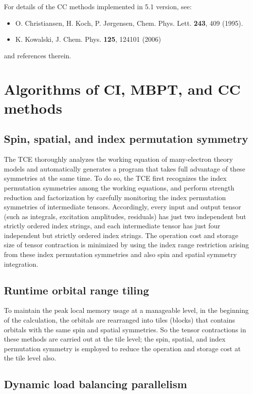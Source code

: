For details of the CC methods implemented in 5.1 version, see:
\begin{itemize}
\item O. Christiansen, H. Koch, P. J\o rgensen, Chem. Phys. Lett. {\bf 243}, 409 (1995). 
\item K. Kowalski, J. Chem. Phys. {\bf 125}, 124101 (2006)
\end{itemize}
and references therein.

\section{Algorithms of CI, MBPT, and CC methods}

\subsection{Spin, spatial, and index permutation symmetry}

The TCE thoroughly analyzes the working equation of many-electron theory models and 
automatically generates a program that takes full advantage of these symmetries at the same time.
To do so, the TCE first recognizes the index permutation symmetries among the working equations,
and perform strength reduction and factorization by carefully monitoring the index permutation
symmetries of intermediate tensors.  Accordingly, every input and output tensor (such as 
integrals, excitation amplitudes, residuals) has just two independent but strictly ordered index strings,
and each intermediate tensor has just four independent but strictly ordered index strings.
The operation cost and storage size of tensor contraction is minimized by using the index range 
restriction arising from these index permutation symmetries and also spin and spatial symmetry integration.

\subsection{Runtime orbital range tiling}

To maintain the peak local memory usage at a manageable level, in the beginning of the calculation,
the orbitals are rearranged into tiles (blocks) that contains orbitals with the same spin and spatial
symmetries.  So the tensor contractions in these methods are carried out at the tile level; the spin,
spatial, and index permutation symmetry is employed to reduce the operation and storage cost at the tile 
level also.

\subsection{Dynamic load balancing parallelism}

